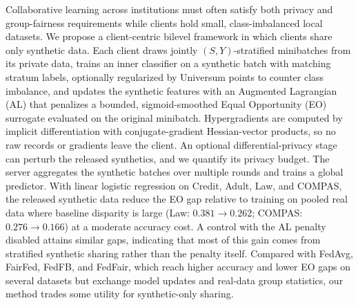 
Collaborative learning across institutions must often satisfy both privacy and group-fairness requirements while clients hold small, class-imbalanced local datasets. We propose a client-centric bilevel framework in which clients share only synthetic data. Each client draws jointly $(S,Y)$-stratified minibatches from its private data, trains an inner classifier on a synthetic batch with matching stratum labels, optionally regularized by Universum points to counter class imbalance, and updates the synthetic features with an Augmented Lagrangian (AL) that penalizes a bounded, sigmoid-smoothed Equal Opportunity (EO) surrogate evaluated on the original minibatch. Hypergradients are computed by implicit differentiation with conjugate-gradient Hessian-vector products, so no raw records or gradients leave the client. An optional differential-privacy stage can perturb the released synthetics, and we quantify its privacy budget. The server aggregates the synthetic batches over multiple rounds and trains a global predictor. With linear logistic regression on Credit, Adult, Law, and COMPAS, the released synthetic data reduce the EO gap relative to training on pooled real data where baseline disparity is large (Law: $0.381\to0.262$; COMPAS: $0.276\to0.166$) at a moderate accuracy cost. A control with the AL penalty disabled attains similar gaps, indicating that most of this gain comes from stratified synthetic sharing rather than the penalty itself. Compared with FedAvg, FairFed, FedFB, and FedFair, which reach higher accuracy and lower EO gaps on several datasets but exchange model updates and real-data group statistics, our method trades some utility for synthetic-only sharing.

